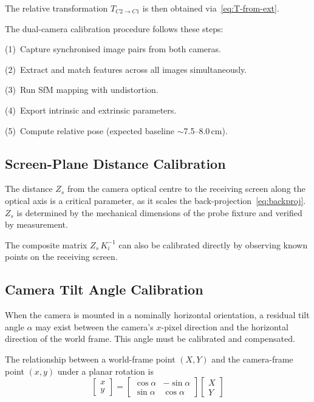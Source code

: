 The relative transformation $T_{C2 \to C1}$ is then obtained
via~\eqref{eq:T-from-ext}.

The dual-camera calibration procedure follows these steps:

(1)~Capture synchronised image pairs from both cameras.

(2)~Extract and match features across all images simultaneously.

(3)~Run SfM mapping with undistortion.

(4)~Export intrinsic and extrinsic parameters.

(5)~Compute relative pose (expected baseline $\sim$7.5--8.0\,cm).



\subsection{Screen-Plane Distance Calibration}
\label{sec:zs}

The distance $Z_s$ from the camera optical centre to the
receiving screen along the optical axis is a critical
parameter, as it scales the back-projection~\eqref{eq:backproj}.
%
$Z_s$ is determined by the mechanical dimensions of the
probe fixture and verified by measurement.

The composite matrix $Z_s\, K_i^{-1}$ can also be calibrated
directly by observing known points on the receiving screen.



\subsection{Camera Tilt Angle Calibration}
\label{sec:tilt-calib}

When the camera is mounted in a nominally horizontal
orientation, a residual tilt angle $\alpha$ may exist
between the camera's $x$-pixel direction and the
horizontal direction of the world frame.
%
This angle must be calibrated and compensated.

The relationship between a world-frame point $(X, Y)$ and
the camera-frame point $(x, y)$ under a planar rotation is
%
\begin{equation}
  \begin{bmatrix} x \\ y \end{bmatrix}
  =
  \begin{bmatrix}
    \cos\alpha & -\sin\alpha \\
    \sin\alpha &  \cos\alpha
  \end{bmatrix}
  \begin{bmatrix} X \\ Y \end{bmatrix}
  \label{eq:tilt-rotation}
\end{equation}

